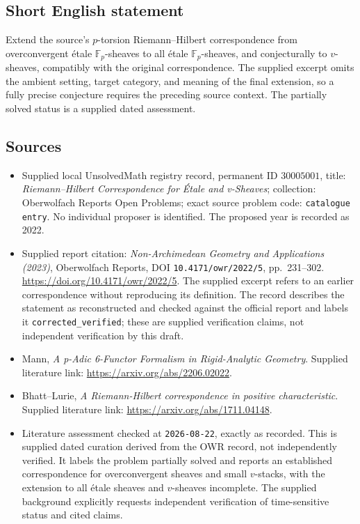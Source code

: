 \documentclass[11pt]{article}
\begin{document}
\subsection{Short English statement}
Extend the source's \(p\)-torsion Riemann--Hilbert correspondence from overconvergent étale \(\mathbb F_p\)-sheaves to all étale \(\mathbb F_p\)-sheaves, and conjecturally to \(v\)-sheaves, compatibly with the original correspondence. The supplied excerpt omits the ambient setting, target category, and meaning of the final extension, so a fully precise conjecture requires the preceding source context. The partially solved status is a supplied dated assessment.
\subsection{Sources}
\begin{itemize}
\item Supplied local UnsolvedMath registry record, permanent ID \(30005001\), title: \emph{Riemann--Hilbert Correspondence for Étale and v-Sheaves}; collection: Oberwolfach Reports Open Problems; exact source problem code: \texttt{catalogue entry}. No individual proposer is identified. The proposed year is recorded as 2022.
\item Supplied report citation: \emph{Non-Archimedean Geometry and Applications (2023)}, Oberwolfach Reports, DOI \texttt{10.4171/owr/2022/5}, pp.~231--302. \url{https://doi.org/10.4171/owr/2022/5}. The supplied excerpt refers to an earlier correspondence without reproducing its definition. The record describes the statement as reconstructed and checked against the official report and labels it \texttt{corrected\_verified}; these are supplied verification claims, not independent verification by this draft.
\item Mann, \emph{A p-Adic 6-Functor Formalism in Rigid-Analytic Geometry}. Supplied literature link: \url{https://arxiv.org/abs/2206.02022}.
\item Bhatt--Lurie, \emph{A Riemann-Hilbert correspondence in positive characteristic}. Supplied literature link: \url{https://arxiv.org/abs/1711.04148}.
\item Literature assessment checked at \texttt{2026-08-22}, exactly as recorded. This is supplied dated curation derived from the OWR record, not independently verified. It labels the problem partially solved and reports an established correspondence for overconvergent sheaves and small \(v\)-stacks, with the extension to all étale sheaves and \(v\)-sheaves incomplete. The supplied background explicitly requests independent verification of time-sensitive status and cited claims.
\end{itemize}
\end{document}
